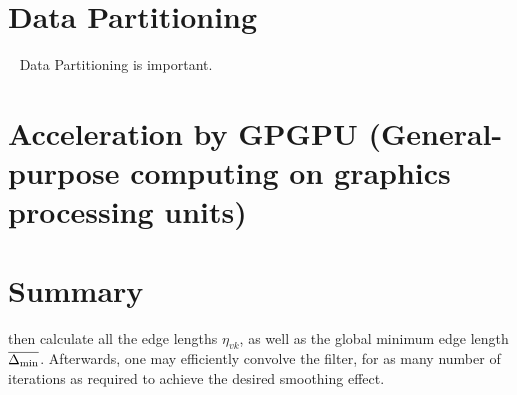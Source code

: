 \section{Data Partitioning}~\cite[p.~357]{Lang17}
Data Partitioning is important.


%
\section[Acceleration by GPGPU]{Acceleration by GPGPU (General-purpose
computing on graphics processing units)}

%
\section{Summary}
then calculate all the edge lengths $\eta_{vk}$, as well as the global minimum edge length $\overline{\Delta_\text{min}}$. Afterwards, one may efficiently convolve the filter, for as many number of iterations as required to achieve the desired smoothing effect.

